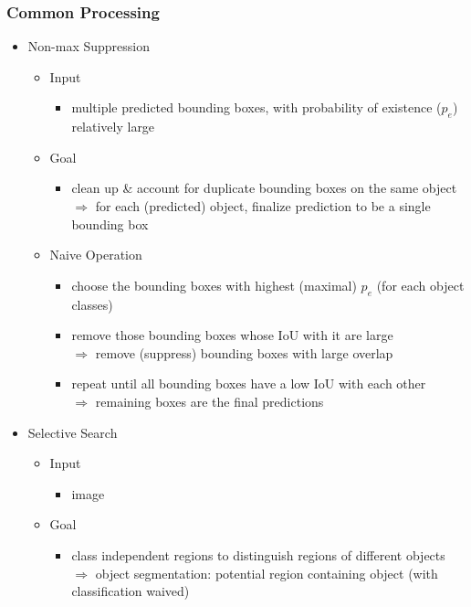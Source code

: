 \subsubsection{Common Processing}
\begin{itemize}
\item Non-max Suppression \label{DL_CV_Objdet_nonmax}
	\begin{itemize}
	\item Input
		\begin{itemize}
		\item multiple predicted bounding boxes, with probability of existence ($p_e$) relatively large
		\end{itemize}
	\item Goal
		\begin{itemize}
		\item clean up \& account for duplicate bounding boxes on the same object \\
		$\Rightarrow$ for each (predicted) object, finalize prediction to be a single bounding box
		\end{itemize}
	\item Naive Operation
		\begin{itemize}
		\item choose the bounding boxes with highest (maximal) $p_e$ (for each object classes)
		\item remove those bounding boxes whose IoU with it are large \\
		$\Rightarrow$ remove (suppress) bounding boxes with large overlap
		\item repeat until all bounding boxes have a low IoU with each other \\
		$\Rightarrow$ remaining boxes are the final predictions
		\end{itemize}
	\end{itemize}
\item Selective Search
	\begin{itemize}
	\item Input
		\begin{itemize}
		\item image
		\end{itemize}
	\item Goal
		\begin{itemize}
		\item class independent regions to distinguish regions of different objects \\
		$\Rightarrow$ object segmentation: potential region containing object (with classification waived)

\end{itemize}
\end{itemize}
\end{itemize}
